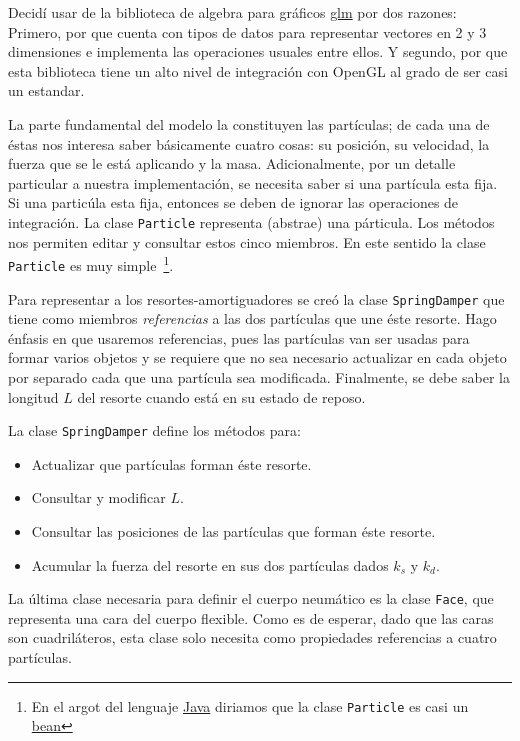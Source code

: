 Decidí usar de la biblioteca de algebra para gráficos \href{http://github.com/g-truc/glm}{glm} por dos razones:
Primero, por que cuenta con tipos de datos para representar vectores en 2 y 3 dimensiones e implementa las operaciones usuales entre ellos.
Y segundo, por que esta biblioteca tiene un alto nivel de integración con OpenGL al grado de ser casi un estandar.

La parte fundamental del modelo la constituyen las partículas; de cada una de éstas nos interesa saber básicamente cuatro cosas: su posición, su velocidad, la fuerza que se le está aplicando y la masa.
Adicionalmente, por un detalle particular a nuestra implementación, se necesita saber si una partícula esta fija.
Si una particúla esta fija, entonces se deben de ignorar las operaciones de integración.
La clase \texttt{Particle} representa (abstrae) una párticula. Los métodos nos permiten editar y consultar estos cinco miembros. En este sentido la clase \texttt{Particle} es muy simple~\footnote{En el argot del lenguaje \href{http://www.java.com/en/}{Java} diriamos que la clase \texttt{Particle} es casi un \href{http://en.wikipedia.org/wiki/JavaBeans}{bean}}.

Para representar a los resortes-amortiguadores se creó la clase \texttt{SpringDamper} que tiene como miembros \emph{referencias} a las dos partículas que une éste resorte.
Hago énfasis en que usaremos referencias, pues las partículas van ser usadas para formar varios objetos y se requiere que no sea necesario actualizar en cada objeto por separado cada que una partícula sea modificada. Finalmente, se debe saber la longitud $L$ del resorte cuando está en su estado de reposo.

La clase \texttt{SpringDamper} define los métodos para:
\begin{itemize}
 \item Actualizar que partículas forman éste resorte.
 \item Consultar y modificar $L$.
 \item Consultar las posiciones de las partículas que forman éste resorte.
 \item Acumular la fuerza del resorte en sus dos partículas dados $k_s$ y $k_d$.
\end{itemize}

La última clase necesaria para definir el cuerpo neumático es la clase \texttt{Face}, que representa una cara del cuerpo flexible.
Como es de esperar, dado que las caras son cuadriláteros, esta clase solo necesita como propiedades referencias a cuatro partículas.

